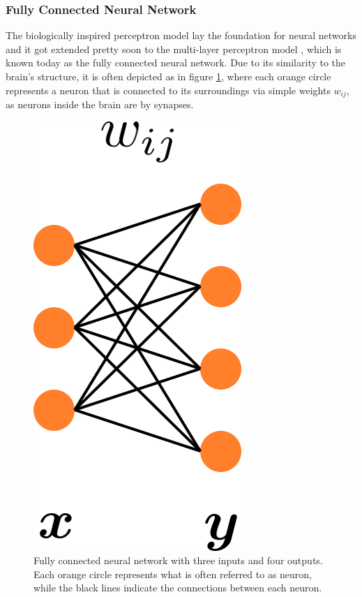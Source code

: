 \subsubsection{Fully Connected Neural Network}
The biologically inspired perceptron model \cite{viglione19704} lay the foundation for neural networks and it got extended pretty soon to the multi-layer perceptron model
\cite{ivakhnenko1971polynomial}, which is known today as the fully connected neural network. Due to its similarity to the brain's structure, it is often depicted as in figure \ref{fig::221_fully_connected}, where each orange circle represents a neuron that is connected to its surroundings via simple weights $w_{ij}$, as neurons inside the brain are by synapses.
\begin{figure}[h!]
	\centering
	\includegraphics[scale=.28]{chapters/02_background/img/fully_connected.png}
	\caption{Fully connected neural network with three inputs and four outputs. Each orange circle represents what is often referred to as neuron, while the black lines indicate the connections between each neuron.}
	\label{fig::221_fully_connected}
\end{figure}
